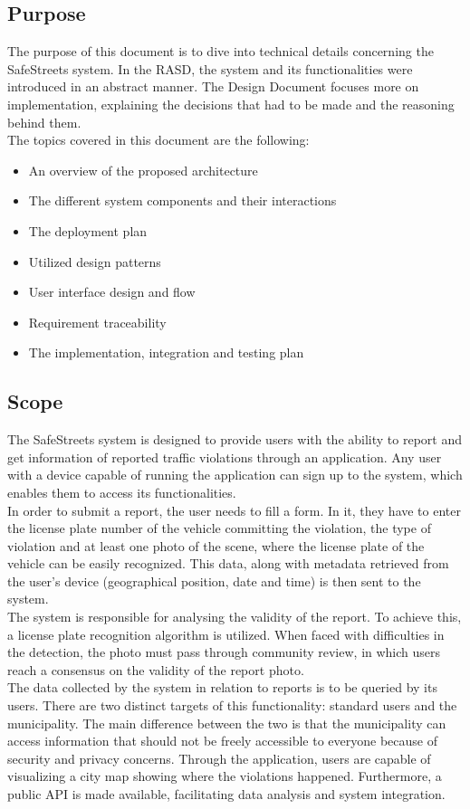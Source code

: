 \subsection{Purpose}

The purpose of this document is to dive into technical details concerning the SafeStreets system. In the RASD, the system and its functionalities were introduced in an abstract manner. The Design Document focuses more on implementation, explaining the decisions that had to be made and the reasoning behind them.\\
The topics covered in this document are the following:

\begin{itemize}
    \item 
    An overview of the proposed architecture
    \item 
    The different system components and their interactions
    \item 
    The deployment plan
    \item 
    Utilized design patterns
    \item 
    User interface design and flow
    \item 
    Requirement traceability
    \item 
    The implementation, integration and testing plan
\end{itemize}


\subsection{Scope}

The SafeStreets system is designed to provide users with the ability to report and get information of reported traffic violations through an application. 
Any user with a device capable of running the application can sign up to the system, which enables them to access its functionalities.\\
In order to submit a report, the user needs to fill a form. In it, they have to enter the license plate number of the vehicle committing the violation, the type of violation and at least one photo of the scene, where the license plate of the vehicle can be easily recognized. This data, along with metadata retrieved from the user's device (geographical position, date and time) is then sent to the system.\\
The system is responsible for analysing the validity of the report. To achieve this, a license plate recognition algorithm is utilized. When faced with difficulties in the detection, the photo must pass through community review, in which users reach a consensus on the validity of the report photo.\\
The data collected by the system in relation to reports is to be queried by its users. There are two distinct targets of this functionality: standard users and the municipality. The main difference between the two is that the municipality can access information that should not be freely accessible to everyone because of security and privacy concerns. Through the application, users are capable of visualizing a city map showing where the violations happened. Furthermore, a public API is made available, facilitating data analysis and system integration.

